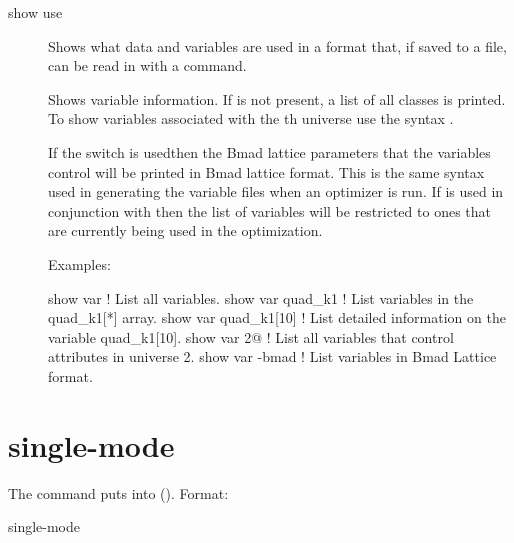 {{{\begin{description}

\item[show use] \Newline
Shows what data and variables are used in a format that, if saved to a file, can
be read in with a  command.


\item[\protect\parbox{6in}{
        show variable \{<var\_name> <locations>\} \\
        show variable <universe\_number>@}
        show variable -bmad\_format \{-good\_opt\_only\} ] \Newline
Shows variable information. If  is not
present,  a list of all  classes is printed. To show variables
associated with the th universe use the syntax .

If the  switch is usedthen the Bmad lattice parameters that
the \tao variables control will be printed in Bmad lattice
format. This is the same syntax used in generating the variable files
when an optimizer is run. If  is used in conjunction with
 then the list of variables will be restricted to ones that
are currently being used in the optimization.

Examples:
\begin{example}
  show var             ! List all variables.
  show var quad_k1     ! List variables in the quad_k1[*] array.
  show var quad_k1[10] ! List detailed information on the variable quad_k1[10].
  show var 2@          ! List all variables that control attributes in universe 2.
  show var -bmad       ! List variables in Bmad Lattice format.
\end{example}

\end{description}

\section{single-mode}
\label{s:sing}

The  command puts \tao into  ().
Format:
\begin{example}
  single-mode
\end{example}

}}}
